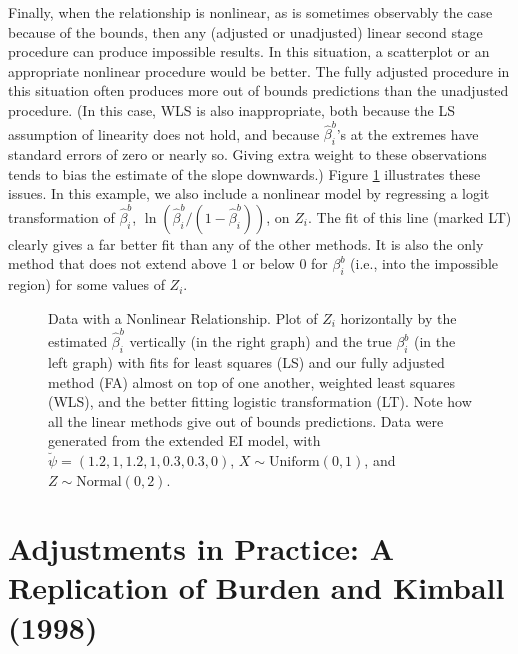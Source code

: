 \documentclass[11pt,titlepage]{article}
\begin{document}
Finally, when the relationship is nonlinear, as is sometimes
observably the case because of the bounds, then any (adjusted or
unadjusted) linear second stage procedure can produce impossible
results.  In this situation, a scatterplot or an appropriate nonlinear
procedure would be better.  The fully adjusted procedure in this
situation often produces more out of bounds predictions than the
unadjusted procedure.  (In this case, WLS is also inappropriate, both
because the LS assumption of linearity does not hold, and because
$\hat\beta_i^b$'s at the extremes have standard errors of zero or
nearly so.  Giving extra weight to these observations tends to bias
the estimate of the slope downwards.)  Figure \ref{f:nonlinear}
illustrates these issues.  In this example, we also include a
nonlinear model by regressing a logit transformation of
$\hat\beta_i^b$, $\ln(\hat\beta_i^b/(1-\hat\beta_i^b))$, on $Z_i$.
The fit of this line (marked LT) clearly gives a far better fit than
any of the other methods.  It is also the only method that does not
extend above 1 or below 0 for $\beta_i^b$ (i.e., into the impossible
region) for some values of $Z_i$.
\begin{figure}[t]
  \begin{center}
    \caption{Data with a Nonlinear Relationship.  Plot of $Z_i$ 
      horizontally by the estimated $\hat\beta_i^b$ vertically (in the
      right graph) and the true $\beta_i^b$ (in the left graph) with
      fits for least squares (LS) and our fully adjusted method (FA)
      almost on top of one another, weighted least squares (WLS), and
      the better fitting logistic transformation (LT).  Note how all
      the linear methods give out of bounds predictions.  Data were
      generated from the extended EI model, with
      $\breve\psi=(1.2,1,1.2,1,0.3,0.3,0)$, $X \sim \textrm{Uniform}(0,1)$, and
      $Z \sim \textrm{Normal}(0,2)$.}
    \label{f:nonlinear}
  \end{center}
\end{figure}

\section{Adjustments in Practice: A Replication of Burden and Kimball (1998)}
\end{document}
